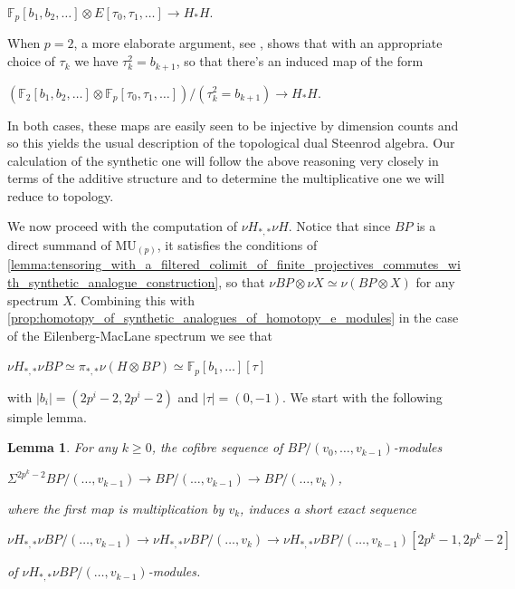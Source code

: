 \documentclass[oneside,a4paper]{amsart}
\newcommand{\MU}{\mathrm{MU}} %
\newcommand{\fieldp}{\mathbb{F}_{p}} %
\theoremstyle{plain}
\newtheorem{lemma}[thm]{Lemma}
\theoremstyle{definition}
\theoremstyle{remark}
\begin{document}
\begin{center}
$\mathbb{F}_{p}[b_{1}, b_{2}, \ldots] \otimes E[\tau_{0}, \tau_{1}, \ldots] \rightarrow H_{*}H$. 
\end{center}
When $p = 2$, a more elaborate argument, see \cite{jeanneret2012cohomology}, shows that with an appropriate choice of $\tau_{k}$ we have $\tau_{k}^{2} = b_{k+1}$, so that there's an induced map of the form

\begin{center}
$(\mathbb{F}_{2}[b_{1}, b_{2}, \ldots] \otimes \mathbb{F}_{p}[\tau_{0}, \tau_{1}, \ldots]) / (\tau_{k}^{2} = b_{k+1})\rightarrow H_{*}H$. 
\end{center}
In both cases, these maps are easily seen to be injective by dimension counts and so this yields the usual description of the topological dual Steenrod algebra. Our calculation of the synthetic one will follow the above reasoning very closely in terms of the additive structure and to determine the multiplicative one we will reduce to topology. 

We now proceed with the computation of $\nu H_{*, *} \nu H$. Notice that since $BP$ is a direct summand of $\MU_{(p)}$, it satisfies the conditions of \cref{lemma:tensoring_with_a_filtered_colimit_of_finite_projectives_commutes_with_synthetic_analogue_construction}, so that $\nu BP \otimes \nu X \simeq \nu (BP \otimes X)$ for any spectrum $X$. Combining this with \cref{prop:homotopy_of_synthetic_analogues_of_homotopy_e_modules} in the case of the Eilenberg-MacLane spectrum we see that 

\begin{center}
$\nu H _{*, *} \nu BP \simeq \pi_{*, *} \nu (H \otimes BP) \simeq \fieldp[b_{1}, \ldots][\tau]$
\end{center}
with $| b_{i} | = (2p^{i}-2, 2p^{i}-2)$ and $| \tau | = (0, -1)$. We start with the following simple lemma. 

\begin{lemma}
\label{multiplication_by_vk_fibre_sequences_yield_a_short_exact_sequence_on_synthetic_mod_p_homology}
For any $k \geq 0$, the cofibre sequence of $BP/(v_{0}, \ldots, v_{k-1})$-modules 

\begin{center}
$\Sigma ^{2p^{k}-2} BP/(\ldots, v_{k-1}) \rightarrow BP/(\ldots, v_{k-1}) \rightarrow BP/(\ldots, v_{k})$, 
\end{center}
where the first map is multiplication by $v_{k}$, induces a short exact sequence 

\begin{center}
$\nu H _{*, *} \nu BP/(\ldots, v_{k-1}) \rightarrow \nu H_{*, *} \nu BP / (\ldots, v_{k}) \rightarrow \nu H_{*, *} \nu BP / (\ldots, v_{k-1})[2p^{k}-1, 2p^{k}-2]$
\end{center}
of $\nu H_{*, *} \nu BP / (\ldots, v_{k-1})$-modules. 
\end{lemma}
\end{document}
